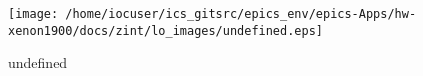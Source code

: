 \noindent
\vspace{1.4cm}
\begin{minipage}{.2\textwidth}
\begin{center}
\texttt{[image: /home/iocuser/ics\_gitsrc/epics\_env/epics-Apps/hw-xenon1900/docs/zint/lo\_images/undefined.eps]}
\end{center}
\end{minipage}
\begin{minipage}{.7\textwidth}
undefined
\end{minipage}


